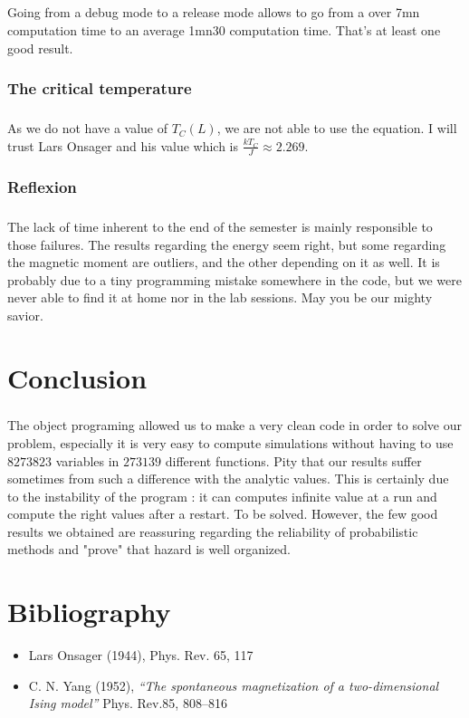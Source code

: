 \documentclass[a4paper, twoside, 11pt]{report}
\theoremstyle{theorem}
\theoremstyle{remark}
\theoremstyle{exemple}
\begin{document}
            \paragraph{}Going from a debug mode to a release mode allows to go from a over 7mn computation time to an average 1mn30 computation time. That's at least one good result.
            
        \newpage
        \subsection{The critical temperature}
        
       		\paragraph{}As we do not have a value of $T_C(L)$, we are not able to use the equation. I will trust Lars Onsager and his value which is $\frac{kT_C}{J}\approx 2.269$.
		
		\subsection{Reflexion}
		
			\paragraph{}The lack of time inherent to the end of the semester is mainly responsible to those failures. The results regarding the energy seem right, but some regarding the magnetic moment are outliers, and the other depending on it as well. It is probably due to a tiny programming mistake somewhere in the code, but we were never able to find it at home nor in the lab sessions. May you be our mighty savior.

\chapter*{Conclusion}

    \paragraph{}The object programing allowed us to make a very clean code in order to solve our problem, especially it is very easy to compute simulations without having to use $8273823$ variables in $273139$ different functions. Pity that our results suffer sometimes from such a difference with the analytic values. This is certainly due to the instability of the program : it can computes infinite value at a run and compute the right values after a restart. To be solved. However, the few good results we obtained are reassuring regarding the reliability of probabilistic methods and "prove" that hazard is well organized.
    

\chapter*{Bibliography}
    
    \begin{itemize}
        \item Lars Onsager (1944), Phys. Rev. 65, 117
        \item C. N. Yang (1952), \textit{“The spontaneous magnetization of a two-dimensional Ising model”} Phys. Rev.85, 808–816
    \end{itemize}
    
\end{document}
